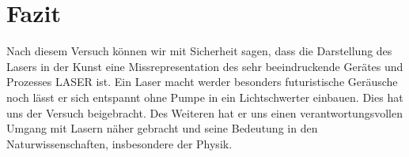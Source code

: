 

\chapter{Fazit}
\label{chap:fazit}

Nach diesem Versuch können wir mit Sicherheit sagen, dass die Darstellung des Lasers in der Kunst eine Missrepresentation
des sehr beeindruckende Gerätes und Prozesses LASER ist. Ein Laser macht werder besonders futuristische Geräusche noch 
lässt er sich entspannt ohne Pumpe in ein Lichtschwerter einbauen. Dies hat uns der Versuch beigebracht. Des Weiteren hat
er uns einen verantwortungsvollen Umgang mit Lasern näher gebracht und seine Bedeutung in den Naturwissenschaften, insbesondere der Physik.